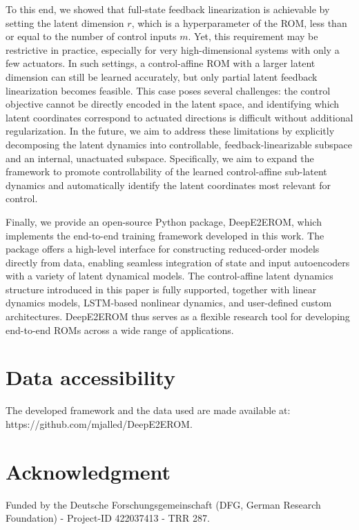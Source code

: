 \documentclass{article}
\begin{document}
To this end, we showed that full-state feedback linearization is achievable by setting the latent dimension $r$, which is a hyperparameter of the ROM, less than or equal to the number of control inputs $m$.
Yet, this requirement may be restrictive in practice, especially for very high-dimensional systems with only a few actuators.
In such settings, a control-affine ROM with a larger latent dimension can still be learned accurately, but only partial latent feedback linearization becomes feasible.
This case poses several challenges: the control objective cannot be directly encoded in the latent space, and identifying which latent coordinates correspond to actuated directions is difficult without additional regularization. 
In the future, we aim to address these limitations by explicitly decomposing the latent dynamics into controllable, feedback-linearizable subspace and an internal, unactuated subspace.
Specifically, we aim to expand the framework to promote controllability of the learned control-affine sub-latent dynamics and automatically identify the latent coordinates most relevant for control.

Finally, we provide an open-source Python package, DeepE2EROM, which implements the end-to-end training framework developed in this work.
The package offers a high-level interface for constructing reduced-order models directly from data, enabling seamless integration of state and input autoencoders with a variety of latent dynamical models.
The control-affine latent dynamics structure introduced in this paper is fully supported, together with linear dynamics models, LSTM-based nonlinear dynamics, and user-defined custom architectures.
DeepE2EROM thus serves as a flexible research tool for developing end-to-end ROMs across a wide range of applications.

\section*{Data accessibility}
The developed framework and the data used are made available at: https://github.com/mjalled/DeepE2EROM.

\section*{Acknowledgment}
Funded by the Deutsche Forschungsgemeinschaft (DFG, German Research Foundation) - Project-ID 422037413 - TRR 287.




\end{document}
